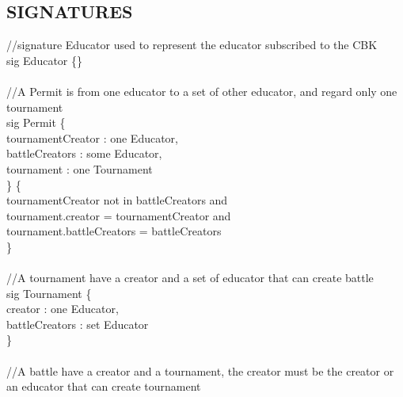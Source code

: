 \documentclass{article}
\begin{document}
{\subsection{SIGNATURES}
    \color{gray}
    //signature Educator used to represent the educator subscribed to the CBK  \\
    \color{blue}
    sig 
    \color{black}
    Educator  \{\} \\
    \\
    \color{gray}
    //A Permit is from one educator to a set of other educator, and regard only one tournament\\
    \color{blue}
    sig 
    \color{black}
    Permit \{\\
	\-\hspace{1cm}    tournamentCreator : \color{blue} one \color{black} Educator,\\ 
    \-\hspace{1cm}    battleCreators : \color{blue} some \color{black} Educator,\\
	\-\hspace{1cm}    tournament : \color{blue} one \color{black} Tournament\\
    \}	\{\\
	\-\hspace{1cm}    tournamentCreator \color{blue} not in \color{black} battleCreators \color{blue} and \color{black}\\
	\-\hspace{1cm}    tournament.creator \color{blue} = \color{black} tournamentCreator \color{blue} and \color{black}\\
	\-\hspace{1cm}    tournament.battleCreators \color{blue} = \color{black} battleCreators\\
    \}\\
    \\
    \color{gray} 
    //A tournament have a creator and a set of educator that can create battle\\
    \color{blue}
    sig 
    \color{black}
    Tournament \{ \\
	\-\hspace{1cm}    creator : \color{blue} one \color{black} Educator,\\
	\-\hspace{1cm}    battleCreators : \color{blue} set \color{black} Educator\\
    \}\\
    \color{gray}
    \\    
    //A battle have a creator and a tournament, the creator must be the creator or an educator that can create tournament\\
}
\end{document}
